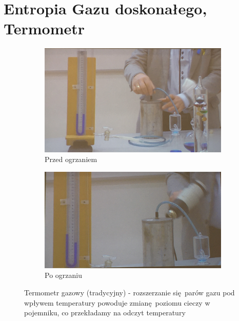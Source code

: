 \documentclass[12pt,a4paper]{report}
\newenvironment{lecture}[1]{\par\medskip
   \noindent\chapter{#1} \rmfamily}{\medskip}
\begin{document}
\begin{lecture}{Entropia Gazu doskonałego, Termometr}
    \begin{figure}[ht!]
         \centering
         \begin{subfigure}[b]{0.4\textwidth}
             \centering
             \includegraphics[width=\textwidth]{Wyk_6_Rys_1.JPG}
             \caption{Przed ogrzaniem}
             \label{fig:lec_6:term_1.1}
         \end{subfigure}
         \hfill
         \begin{subfigure}[b]{0.4\textwidth}
             \centering
             \includegraphics[width=\textwidth]{Wyk_6_Rys_2.JPG}
             \caption{Po ogrzaniu}
             \label{fig:lec_6:term_1.2}
         \end{subfigure}
        \caption{Termometr gazowy (tradycyjny) - rozszerzanie się parów gazu pod wpływem temperatury powoduje zmianę poziomu cieczy w pojemniku, co przekładamy na odczyt temperatury}
        \label{fig:lec_6:term_1}
     \end{figure}
    

\end{lecture}
\end{document}
